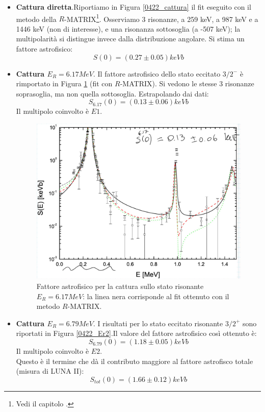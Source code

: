 \begin{itemize}
	\item \textbf{Cattura diretta}.Riportiamo in Figura \ref{0422_cattura} il fit eseguito con il metodo della $R$-MATRIX\footnote{Vedi il capitolo .}. Osserviamo 3 risonanze, a 259 keV, a 987 keV e a 1446 keV (non di interesse), e una risonanza sottosoglia (a -507 keV); la multipolarità si distingue invece dalla distribuzione angolare. Si stima un fattore astrofisico: $$S(0)= (0.27\pm0.05) \unit{keV b}$$
	\item \textbf{Cattura $E_R=6.17\unit{MeV}$}. Il fattore astrofisico dello stato eccitato $3/2^-$ è rimportato in Figura \ref{0422_Er1} (fit con $R$-MATRIX). Si vedono le stesse 3 risonanze soprasoglia, ma non quella sottosoglia. Estrapolando dai dati: $$S_{6.17}(0)= (0.13\pm0.06) \unit{keV b}$$ Il multipolo coinvolto è $E1$. %
	\begin{figure}[h]
		\centering
		\includegraphics[scale=0.5]{Immagini/0422_0-Se-1.png}
		\caption{Fattore astrofisico per la cattura sullo stato risonante $E_R=6.17\unit{MeV}$: la linea nera corrisponde al fit ottenuto con il metodo $R$-MATRIX.}
		\label{0422_Er1}
	\end{figure}	
	\item \textbf{Cattura $E_R=6.79\unit{MeV}$}. I risultati per lo stato eccitato risonante $3/2^+$ sono riportati in Figura \ref{0422_Er2}.Il valore del fattore astrofisico così ottenuto è: $$S_{6.79}(0) = (1.18\pm 0.05)\unit{keV b}$$ Il multipolo coinvolto è $E2$.\\ Questo è il termine che dà il contributo maggiore al fattore astrofisco totale (misura di LUNA II): $$S_{tot}(0) = (1.66\pm 0.12)\unit{keV b}$$%

\end{itemize}
